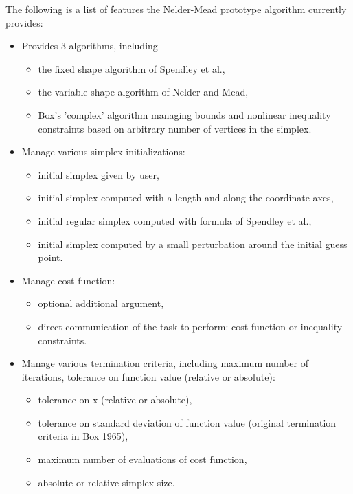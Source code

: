 \begin{Description}
\begin{itemize}
\end{itemize}



The following is a list of features the Nelder-Mead prototype algorithm
currently provides:\begin{itemize}

\item Provides 3 algorithms, including \begin{itemize}

\item the fixed shape algorithm of Spendley et al.,
\item the variable shape algorithm of Nelder and Mead,
\item Box's 'complex' algorithm managing bounds and nonlinear inequality
constraints based on arbitrary number of vertices in the simplex.

\end{itemize}

\item Manage various simplex initializations: \begin{itemize}

\item initial simplex given by user,
\item initial simplex computed with a length and along the coordinate
axes,
\item initial regular simplex computed with formula of Spendley et al.,
\item initial simplex computed by a small perturbation around the initial
guess point.

\end{itemize}

\item Manage cost function: \begin{itemize}

\item optional additional argument,
\item direct communication of the task to perform: cost function or
inequality constraints.

\end{itemize}

\item Manage various termination criteria, including maximum number of
iterations, tolerance on function value (relative or absolute):\begin{itemize}

\item tolerance on x (relative or absolute),
\item tolerance on standard deviation of function value (original
termination criteria in Box 1965),
\item maximum number of evaluations of cost function,
\item absolute or relative simplex size.


\end{itemize}
\end{itemize}
\end{Description}
